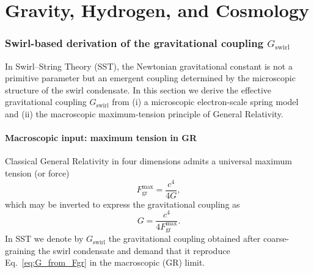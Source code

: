 \documentclass[10pt,reprint,aps,onecolumn,nofootinbib]{revtex4-2}
\begin{document}

\newpage
\part{Gravity, Hydrogen, and Cosmology}

    \section{Swirl-based derivation of the gravitational coupling\texorpdfstring{ \(G_{\text{swirl}}\)}{ G_swirl}}
        \label{sec:G_swirl_derivation}

        In Swirl--String Theory (SST), the Newtonian gravitational constant is not a
        primitive parameter but an emergent coupling determined by the microscopic
        structure of the swirl condensate. In this section we derive the effective
        gravitational coupling \(G_{\text{swirl}}\) from (i) a microscopic electron-scale
        spring model and (ii) the macroscopic maximum-tension principle of General
        Relativity.

        \subsection{Macroscopic input: maximum tension in GR}

            Classical General Relativity in four dimensions admits a universal maximum
            tension (or force) \cite{Gibbons2002_MaxTension}
            \begin{equation}
                F_{\text{gr}}^{\max}
                = \frac{c^4}{4G},
                \label{eq:F_gr_max_GR}
            \end{equation}
            which may be inverted to express the gravitational coupling as
            \begin{equation}
                G = \frac{c^4}{4 F_{\text{gr}}^{\max}}.
                \label{eq:G_from_Fgr}
            \end{equation}
            In SST we denote by \(G_{\text{swirl}}\) the gravitational coupling obtained
            after coarse-graining the swirl condensate and demand that it reproduce
            Eq.~\eqref{eq:G_from_Fgr} in the macroscopic (GR) limit.
\end{document}
